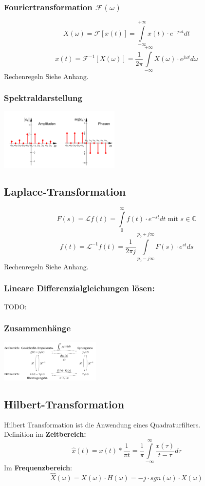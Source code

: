 \begin{multicols}{2}
  
  \subsubsection*{Fouriertransformation $\mathcal{F}(\omega)$}
  $$ X(\omega) = \mathcal{F}[x(t)] = \int \limits _{-\infty} ^{+\infty} x(t) \cdot e^{-j \omega t} dt $$
  $$ x(t) = \mathcal{F}^{-1}[X(\omega)] = \frac{1}{2 \pi} \int \limits _{- \infty} ^{+ \infty} X(\omega) \cdot e^{j \omega t} d\omega$$
  Rechenregeln Siehe Anhang.


  \subsubsection*{Spektraldarstellung}
  \includegraphics[width = 6cm]{include/Integraltransformationen/img/Spektrum.png}
\end{multicols}

\subsection{Laplace-Transformation}
$$F(s) = \mathscr{L} {f(t)} = \int \limits _{0} ^{\infty} f(t) \cdot e^{-st} dt \textrm{ mit } s \in \mathbb{C}$$
$$f(t) = \mathscr{L}^{-1} {f(t)} = \frac{1}{2\pi j} \int \limits _{p_0-j\infty} ^{p_0 + j\infty} F(s) \cdot e^{st} ds$$
Rechenregeln Siehe Anhang.
\subsubsection*{Lineare Differenzialgleichungen lösen:}

{\huge TODO: }

\subsubsection*{Zusammenhänge}
\includegraphics[width = 5cm]{include/Integraltransformationen/img/Zusammenhang_Laplace.png}
\subsection{Hilbert-Transformation}
Hilbert Transformation ist die Anwendung eines Quadraturfilters. \\
Definition im \textbf{Zeitbereich:}
$$\hat{x}(t) = x(t) * \frac{1}{\pi t} = \frac{1}{\pi} \int \limits _{-\infty} ^{\infty} \frac{x(\tau)}{t-\tau} d\tau$$
Im \textbf{Frequenzbereich}:
$$\hat{X}(\omega) = X(\omega) \cdot H(\omega) = -j \cdot sgn(\omega) \cdot X(\omega)$$
